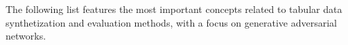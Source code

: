 \documentclass[oneside,10pt]{book}
\begin{document}
The following list features the most important concepts related to tabular data synthetization and evaluation methods, with a focus on generative adversarial networks. %




\end{document}
